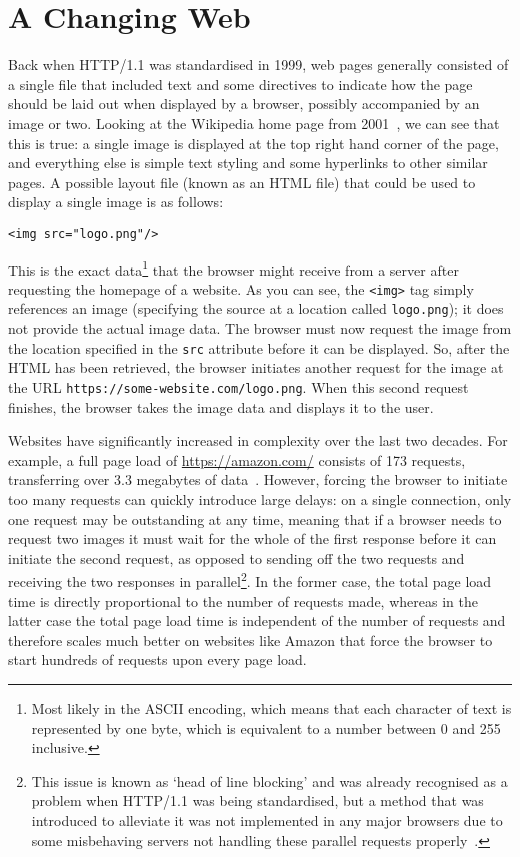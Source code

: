 \section{A Changing Web}

Back when HTTP/1.1 was standardised in 1999, web pages generally consisted of a single file that included text and some directives to indicate how the page should be laid out when displayed by a browser, possibly accompanied by an image or two. Looking at the Wikipedia home page from 2001~\cite{wikiold}, we can see that this is true: a single image is displayed at the top right hand corner of the page, and everything else is simple text styling and some hyperlinks to other similar pages. A possible layout file (known as an HTML file) that could be used to display a single image is as follows:

\begin{verbatim}
<img src="logo.png"/>
\end{verbatim}

This is the exact data\footnote{Most likely in the ASCII encoding, which means that each character of text is represented by one byte, which is equivalent to a number between 0 and 255 inclusive.} that the browser might receive from a server after requesting the homepage of a website. As you can see, the \texttt{<img>} tag simply references an image (specifying the source at a location called \texttt{logo.png}); it does not provide the actual image data. The browser must now request the image from the location specified in the \texttt{src} attribute before it can be displayed. So, after the HTML has been retrieved, the browser initiates another request for the image at the URL \texttt{https://some-website.com/logo.png}. When this second request finishes, the browser takes the image data and displays it to the user.

Websites have significantly increased in complexity over the last two decades. For example, a full page load of \url{https://amazon.com/} consists of 173 requests, transferring over 3.3 megabytes of data~\cite{requestchecker}. However, forcing the browser to initiate too many requests can quickly introduce large delays: on a single connection, only one request may be outstanding at any time, meaning that if a browser needs to request two images it must wait for the whole of the first response before it can initiate the second request, as opposed to sending off the two requests and receiving the two responses in parallel\footnote{This issue is known as `head of line blocking' and was already recognised as a problem when HTTP/1.1 was being standardised, but a method that was introduced to alleviate it was not implemented in any major browsers due to some misbehaving servers not handling these parallel requests properly~\cite{pipelining}.}. In the former case, the total page load time is directly proportional to the number of requests made, whereas in the latter case the total page load time is independent of the number of requests and therefore scales much better on websites like Amazon that force the browser to start hundreds of requests upon every page load.


